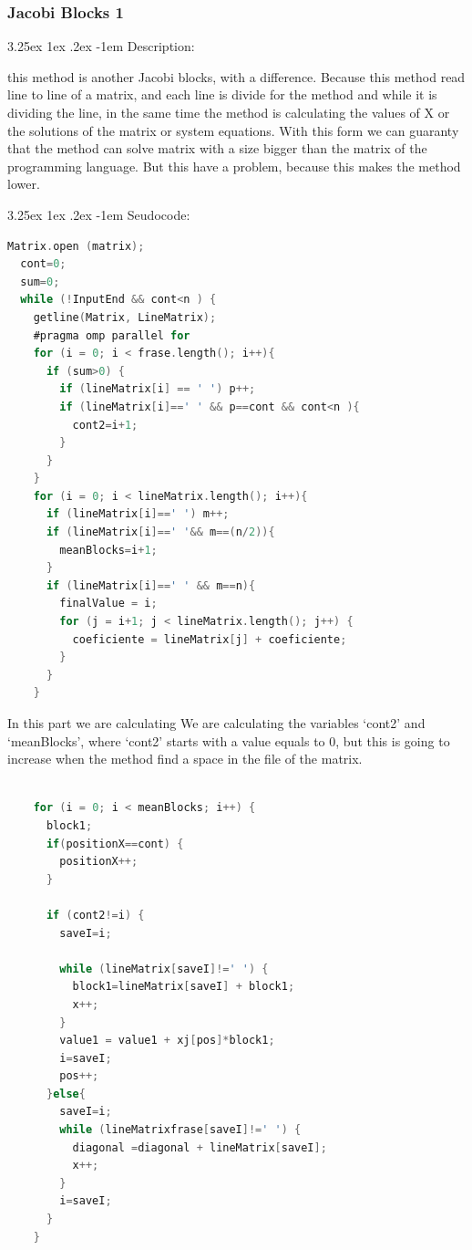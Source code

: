 \documentclass{article}
\makeatletter
\renewcommand\paragraph{\@startsection{paragraph}{5}{\z@}%
  {3.25ex \@plus1ex \@minus.2ex}%
  {-1em}%
  {\normalfont\normalsize\bfseries}}
\makeatother
\begin{document}
\subsubsection{Jacobi Blocks 1}


\paragraph{Description:}
\hfill \break

this method is another Jacobi blocks, with a difference. Because this method read line to line of a matrix, and each line is divide for the method and while it is dividing the line, in the same time the method is calculating the values of X or the solutions of the matrix or system equations. With this form we can guaranty that the method can solve matrix with a size bigger than the matrix of the programming language. But this have a problem, because this makes the method lower.

\paragraph{Seudocode:}
\hfill \break

\begin{lstlisting}[language=C]
  Matrix.open (matrix);
  cont=0;
  sum=0;
  while (!InputEnd && cont<n ) {
    getline(Matrix, LineMatrix);
    #pragma omp parallel for 
    for (i = 0; i < frase.length(); i++){
      if (sum>0) {
        if (lineMatrix[i] == ' ') p++;
        if (lineMatrix[i]==' ' && p==cont && cont<n ){
          cont2=i+1;
        }
      }
    }
    for (i = 0; i < lineMatrix.length(); i++){
      if (lineMatrix[i]==' ') m++;
      if (lineMatrix[i]==' '&& m==(n/2)){
        meanBlocks=i+1;
      }
      if (lineMatrix[i]==' ' && m==n){
        finalValue = i;
        for (j = i+1; j < lineMatrix.length(); j++) {
          coeficiente = lineMatrix[j] + coeficiente;
        }
      }
    }
\end{lstlisting}

In this part we are calculating We are calculating the variables ‘cont2’ and ‘meanBlocks’, where ‘cont2’  starts with a value equals to 0, but this is going to increase when the method find a space in the file of the matrix.  

\begin{lstlisting}[language=C]
     
    for (i = 0; i < meanBlocks; i++) {
      block1;
      if(positionX==cont) {
        positionX++;
      }

      if (cont2!=i) {
        saveI=i;

        while (lineMatrix[saveI]!=' ') {
          block1=lineMatrix[saveI] + block1;
          x++;
        }
        value1 = value1 + xj[pos]*block1;
        i=saveI;
        pos++;
      }else{
        saveI=i;
        while (lineMatrixfrase[saveI]!=' ') {
          diagonal =diagonal + lineMatrix[saveI];
          x++;
        }
        i=saveI;
      }
    }
\end{lstlisting}
\end{document}
